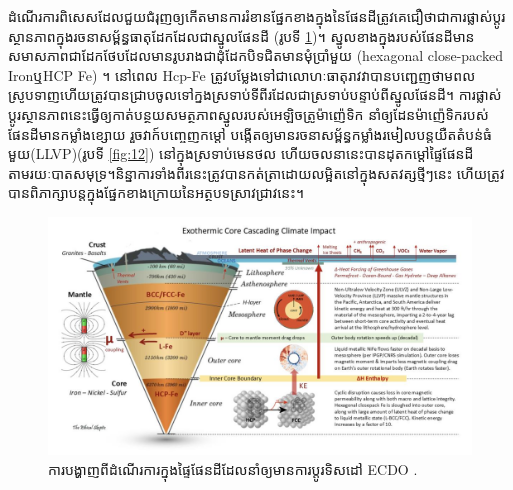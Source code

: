 \documentclass[10pt,twocolumn,letterpaper]{article}
\begin{document}
ដំណើរការពិសេសដែលជួយជំរុញឲ្យកើតមានការរំខានផ្នែកខាងក្នុងនៃផែនដីត្រូវគេជឿថាជាការផ្លាស់ប្តូរស្ថានភាពក្នុងរចនាសម្ព័ន្ធធាតុដែកដែលជាស្នូលផែនដី (រូបទី \ref{fig:11})។ ស្នូលខាងក្នុងរបស់ផែនដីមានសមាសភាពជាដែកថែបដែលមានរូបរាងជាដុំដែកបិទជិតមានមុំប្រាំមួយ (hexagonal close-packed Iron​ឬ​HCP Fe) \cite{141}។ នៅពេល Hcp-Fe ត្រូវបម្លែងទៅជាលោហៈធាតុរាវ​វាបានបញ្ជេញថាមពលស្រូបទាញ​ហើយត្រូវបានជ្រាបចូលទៅក្នងស្រទាប់ទីពីរដែលជាស្រទាប់បន្ទាប់ពីស្នូលផែនដី។ ការផ្លាស់ប្តូរស្ថានភាពនេះធ្វើឲ្យកាត់បន្ថយសមត្ថភាពស្នូលរបស់អេឡិចត្រូម៉ាញ៉េទិក នាំឲ្យដែនម៉ាញ៉េទិករបស់ផែនដីមានកម្លាំងខ្សោយ រួចវាក៍បញ្ចេញកម្តៅ បង្កើតឲ្យមានរចនាសម្ព័ន្ធកម្លាំងរមៀលបន្តយឺតតំបន់ធំមួយ(LLVP)(រូបទី \ref{fig:12}) \cite{38} នៅក្នុងស្រទាប់មេនថល ហើយចលនានេះបានដុតកម្តៅផ្ទៃផែនដីតាមរយៈបាតសមុទ្រ។និន្នាការទាំងពីរនេះត្រូវបានកត់ត្រាដោយលម្អិតនៅក្នុងសតវត្សថ្មីៗនេះ ហើយត្រូវបានពិភាក្សាបន្ដក្នុងផ្នែកខាងក្រោយនៃអត្ថបទស្រាវជ្រាវនេះ។

\begin{figure}[t]
\begin{center}
\includegraphics[width=1\textwidth]{layers.jpg}
\end{center}
   \caption{ការបង្ហាញពីដំណើរការ​ក្នុងផ្ទៃផែនដី​ដែលនាំឲ្យមានការប្ដូរទិសដៅ ECDO \cite{129}.}
\label{fig:11}
\end{figure}
\end{document}
